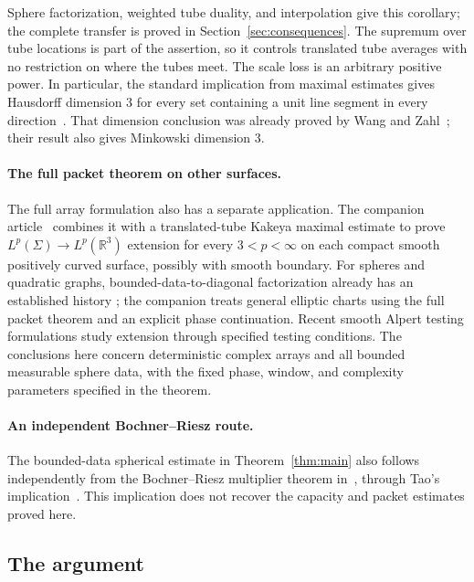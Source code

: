Sphere factorization, weighted tube duality, and interpolation give
this corollary; the complete transfer is proved in
Section~\ref{sec:consequences}. The supremum over tube locations is
part of the assertion, so it controls translated tube averages with
no restriction on where the tubes meet. The scale loss is an arbitrary
positive power. In particular, the standard implication from maximal
estimates gives Hausdorff dimension $3$ for every set containing a
unit line segment in every direction~\cite[Theorem~2.12]{MattilaFourierNotes}.
That dimension conclusion was already proved by Wang and
Zahl~\cite[Theorem~1.1]{WangZahl2025Convex}; their result also gives
Minkowski dimension $3$.

\paragraph{The full packet theorem on other surfaces.}
The full array formulation also has a separate application.
The companion article~\cite[Theorem~1.1]{OpenAIDiagonal2026} combines it with a
translated-tube Kakeya maximal estimate to prove
$L^p(\Sigma)\to L^p(\mathbb R^3)$ extension for every $3<p<\infty$
on each compact smooth positively curved surface, possibly with smooth boundary.
For spheres and quadratic graphs, bounded-data-to-diagonal
factorization already has an established history
\cite{Bourgain1991Besicovitch,Buschenhenke2024}; the companion treats
general elliptic charts using the full packet theorem and an explicit
phase continuation. Recent smooth Alpert testing formulations
\cite{Sawyer2026TestingComparison,RiosSawyer2026ConvolutionTesting}
study extension through specified testing conditions. The conclusions
here concern deterministic complex arrays and all bounded measurable
sphere data, with the fixed phase, window, and complexity parameters
specified in the theorem.

\paragraph{An independent Bochner--Riesz route.}
The bounded-data spherical estimate in Theorem~\ref{thm:main} also
follows independently from the Bochner--Riesz multiplier theorem
in~\cite[Corollary~12.4]{OpenAIBochnerRiesz2026}, through Tao's
implication~\cite{Tao1999Epsilon}. This implication does not recover
the capacity and packet estimates proved here.

\subsection{The argument}

